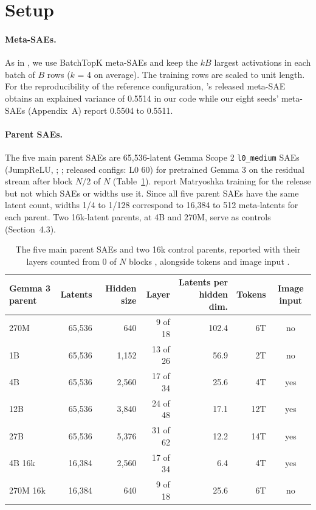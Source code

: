 \section{Setup}

\paragraph{Meta-SAEs.}
As in \citet{leask2025canonical}, we use BatchTopK \citep{bussmann2024batchtopk} meta-SAEs and keep the $kB$ largest activations in each batch of $B$ rows ($k$ = 4 on average).
The training rows are scaled to unit length.
For the reproducibility of the reference configuration, \citeauthor{leask2024metasaerelease}'s \citeyearpar{leask2024metasaerelease} released meta-SAE obtains an explained variance of 0.5514 in our code while our eight seeds' meta-SAEs (Appendix~A) report 0.5504 to 0.5511.

\paragraph{Parent SAEs.}
The five main parent SAEs are 65,536-latent Gemma Scope 2 \texttt{l0\_medium} SAEs (JumpReLU, \citealp{rajamanoharan2024jumprelu}; \citealp{mcdougall2025gemmascope2}; released configs: L0 60) for pretrained Gemma 3 \citep{gemmateam2025gemma3,googledeepmind2025gemma3card} on the residual stream after block $N/2$ of $N$ (Table~\ref{tab:parents}).
\citet{lmit2025gemmascope2blog} report Matryoshka training for the release but not which SAEs or widths use it.
Since all five parent SAEs have the same latent count, widths 1/4 to 1/128 correspond to 16,384 to 512 meta-latents for each parent.
Two 16k-latent parents, at 4B and 270M, serve as controls (Section~4.3).

\begin{table}[t]
  \caption{The five main parent SAEs and two 16k control parents, reported with their layers counted from 0 \citep{mcdougall2025gemmascope2} of $N$ blocks \citep{googledeepmind2026gemmalib}, alongside tokens and image input \citep{gemmateam2025gemma3,googledeepmind2025gemma3card}.}
  \label{tab:parents}
  \centering
  \small
  \begin{tabular}{@{}lrrrrrc@{}}
    \toprule
    Gemma 3 parent & Latents & Hidden size & Layer & Latents per hidden dim. & Tokens & Image input \\
    \midrule
    270M & 65,536 & 640 & 9 of 18 & 102.4 & 6T & no \\
    1B & 65,536 & 1,152 & 13 of 26 & 56.9 & 2T & no \\
    4B & 65,536 & 2,560 & 17 of 34 & 25.6 & 4T & yes \\
    12B & 65,536 & 3,840 & 24 of 48 & 17.1 & 12T & yes \\
    27B & 65,536 & 5,376 & 31 of 62 & 12.2 & 14T & yes \\
    4B 16k & 16,384 & 2,560 & 17 of 34 & 6.4 & 4T & yes \\
    270M 16k & 16,384 & 640 & 9 of 18 & 25.6 & 6T & no \\
    \bottomrule
  \end{tabular}
\end{table}

